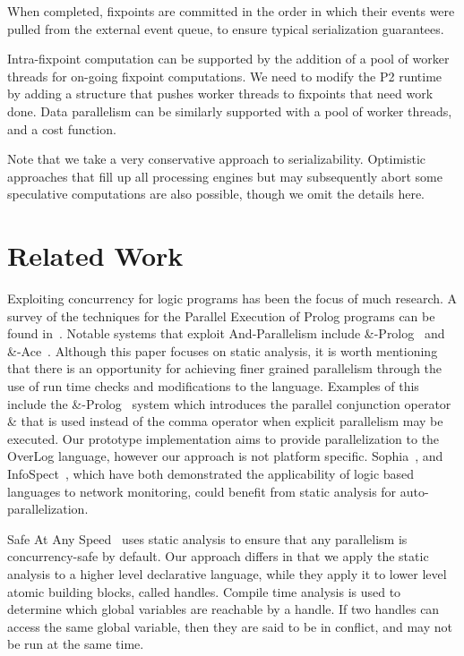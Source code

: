 \documentclass[10pt,twocolumn]{MyTightStyle}
\begin{document}
When completed, fixpoints are committed in the order in which their
events were pulled from the external event queue, to ensure typical
serialization guarantees.

Intra-fixpoint computation can be supported by the addition of a pool of
worker threads for on-going fixpoint computations. We need to modify the
P2 runtime by adding a structure that pushes worker threads to fixpoints
that need work done. Data parallelism can be similarly supported with a
pool of worker threads, and a cost function.

Note that we take a very conservative approach to
serializability. Optimistic approaches that fill up all processing
engines but may subsequently abort some speculative computations are
also possible, though we omit the details here.


\section{Related Work}

Exploiting concurrency for logic programs has been the focus of much research. A survey of the techniques for the Parallel Execution of Prolog programs can be found in~\cite{gupta01}. Notable systems that exploit And-Parallelism include \&-Prolog~\cite{hermenegildo90} and \&-Ace~\cite{gupta97}. Although this paper focuses on static analysis, it is worth mentioning that there is an opportunity for achieving finer grained parallelism through the use of run time checks and modifications to the language. Examples of this include 
the \&-Prolog~\cite{hermenegildo90} system which introduces the parallel conjunction operator \& that is used instead of the comma operator when explicit parallelism may be executed. 
Our prototype implementation aims to provide parallelization to the OverLog language, however our approach is not platform specific. Sophia~\cite{wawrzoniak03}, and InfoSpect~\cite{roscoe02}, which have both demonstrated the applicability of logic based languages to network monitoring, could benefit from static analysis for auto-parallelization.

Safe At Any Speed~\cite{jannotti06} uses static analysis to ensure that any parallelism is concurrency-safe by default. Our approach differs in that we apply the static analysis to a higher level declarative language, while they apply it to lower level atomic building blocks, called handles. Compile time analysis is used to determine which global variables are reachable by a handle. If two handles can access the same global variable, then they are said to be in conflict, and may not be run at the same time. 
\end{document}
